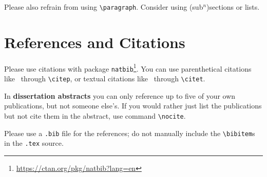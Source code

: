 \documentclass[news]{sigirforum}
\begin{document}
%

Please also refrain from using \texttt{\textbackslash paragraph}. Consider using (sub$^n$)sections or lists.

\section{References and Citations}

Please use citations with package \texttt{natbib}\footnote{\url{https://ctan.org/pkg/natbib?lang=en}}.
You can use parenthetical citations like~\citep{forum} through \texttt{\textbackslash citep}, or textual citations like~\citet{forum} through \texttt{\textbackslash citet}.

In \textbf{dissertation abstracts} you can only reference up to five of your own publications, but not someone else's. If you would rather just list the publications but not cite them in the abstract, use command \texttt{\textbackslash nocite}.

Please use a \texttt{.bib} file for the references; do not manually include the \texttt{\textbackslash bibitem}s in the \texttt{.tex} source.
\end{document}
